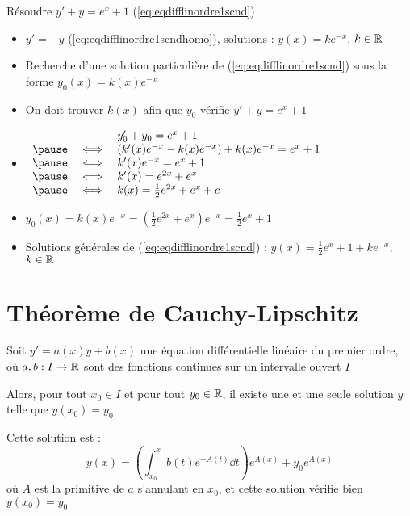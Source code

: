 \begin{frame}

\begin{exemple}
\label{ex:eqdifflinordre1scnd}
Résoudre $y'+y = e^x+1$ \quad (\ref{eq:eqdifflinordre1scnd})

\pause
\begin{itemize}
  \item $y'=-y$ (\ref{eq:eqdifflinordre1scndhomo}), solutions : $y(x) = k e^{-x}$, $k\in\mathbb{R}$
  \pause
  \item Recherche d'une solution particulière de (\ref{eq:eqdifflinordre1scnd}) sous la forme 
  $y_0(x) = k(x) e^{-x}$
  \pause
  \item On doit trouver $k(x)$ afin que $y_0$ vérifie $y'+y = e^x+1$
  \pause
  \item $\begin{array}{rcl}
        && y_0'+y_0 = e^x+1  \\
 \pause       
 & \iff & \left(k'(x) e^{-x} - k(x) e^{-x} \right) + k(x) e^{-x} = e^x+1 \\
 \pause  
 & \iff & k'(x)e^{-x} = e^x+1 \\
 \pause 
 & \iff & k'(x) = e^{2x}+e^x \\
 \pause 
 & \iff & k(x) = \frac12e^{2x}+e^x + c \\
\end{array}$
  \pause 
  \item $y_0(x) =  k(x) e^{-x} = \left(\frac12e^{2x}+e^x\right)e^{-x} = \frac12e^{x}+1$
  \pause 
  \item Solutions générales de (\ref{eq:eqdifflinordre1scnd}) : $y(x) = \frac12e^{x}+1 + k e^{-x}$, $k\in\mathbb{R}$
\end{itemize}

\end{exemple}
\end{frame}



\section*{Théorème de Cauchy-Lipschitz}

\begin{frame}

\begin{theoreme}
\label{th:cauchylipschitzord1}
Soit $y'=a(x)y + b(x)$ une équation différentielle linéaire du premier ordre,
où $a,b : I \to \mathbb{R}$ sont des fonctions continues sur un intervalle ouvert $I$


Alors, pour tout $x_0 \in I$ et pour tout $y_0 \in \mathbb{R}$, il existe une et une 
seule solution $y$ telle que $y(x_0)=y_0$
\end{theoreme}

\bigskip
\pause

Cette solution est :  
$$y(x) = \left(\int_{x_0}^x b(t)e^{-A(t)}\dd t \right)e^{A(x)} + y_0e^{A(x)}$$
où $A$ est la primitive de $a$ s'annulant en $x_0$, et cette solution vérifie bien $y(x_0)=y_0$
\end{frame}


